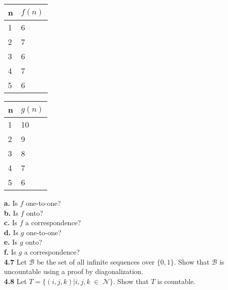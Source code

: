 \documentclass[12pt]{article}
\begin{document}
\begin{center}
\begin{tabular}{l|l}
	n & $f(n)$ \\ \hline
	1 & 6      \\
	2 & 7      \\
	3 & 6      \\
	4 & 7      \\
	5 & 6      \\
\end{tabular}
\quad \quad
\begin{tabular}{l|l}
	n & $g(n)$ \\ \hline
	1 & 10     \\
	2 & 9      \\
	3 & 8      \\
	4 & 7      \\
	5 & 6      \\
\end{tabular}
\end{center}


\textbf{a.} Is $f$ one-to-one? \\

\textbf{b.} Is $f$ onto? \\

\textbf{c.} Is $f$ a correspondence? \\

\textbf{d.} Is $g$ one-to-one? \\

\textbf{e.} Is $g$ onto? \\

\textbf{f.} Is $g$ a correspondence? \\

\pagebreak
\textbf{4.7} Let $\mathcal{B}$ be the set of all infinite sequences over $\{0, 1\}$. 
Show that $\mathcal{B}$ is uncountable using a proof by diagonalization. \\



\pagebreak
\textbf{4.8} Let $T = \{(i, j, k)| i, j, k \; \in \; \mathcal{N}\}$. Show that $T$ is countable. \\



\end{document}
